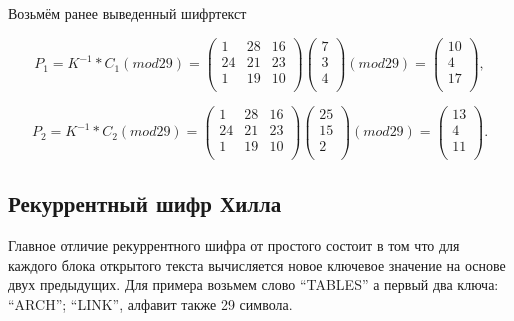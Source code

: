 \documentclass[a4paper]{article}
\begin{document}
Возьмём ранее выведенный шифртекст

\[
    P_1=K^{-1}*C_1 (mod 29)=
    \begin{pmatrix}
        1 & 28 & 16 \\
        24 & 21 & 23 \\
        1 & 19 & 10 \\
    \end{pmatrix}
    \begin{pmatrix}
        7 \\
        3 \\
        4 \\
    \end{pmatrix}
    (mod 29) =
    \begin{pmatrix}
        10 \\
        4 \\
        17 \\
    \end{pmatrix}
    ,
\]

\[
    P_2=K^{-1}*C_2 (mod 29)=
    \begin{pmatrix}
        1 & 28 & 16 \\
        24 & 21 & 23 \\
        1 & 19 & 10 \\
    \end{pmatrix}
    \begin{pmatrix}
        25 \\
        15 \\
        2 \\
    \end{pmatrix}
    (mod 29) =
    \begin{pmatrix}
        13 \\
        4 \\
        11 \\
    \end{pmatrix}
    .
\]
   
\subsection{Рекуррентный шифр Хилла}

Главное отличие рекуррентного шифра от простого состоит в том что для каждого блока открытого текста вычисляется новое ключевое значение на основе двух предыдущих. Для примера возьмем слово “TABLES” а первый два ключа: “ARCH”; “LINK”, алфавит также 29 символа.
\end{document}
